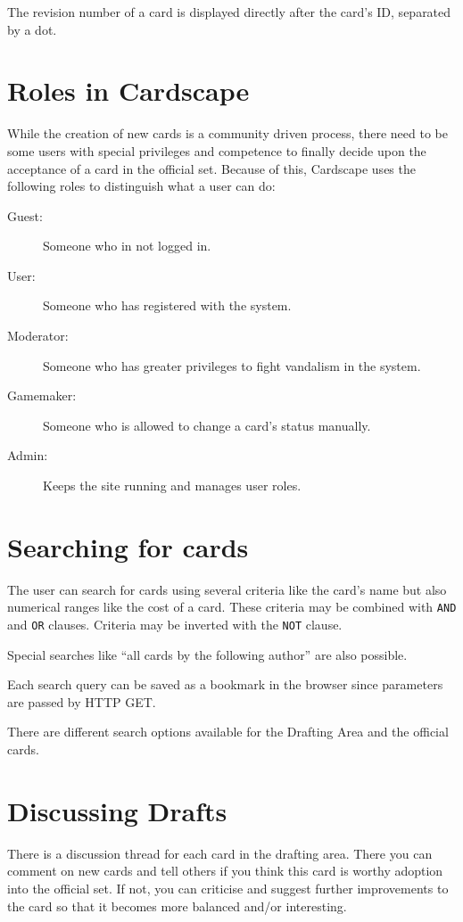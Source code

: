 \documentclass[a4paper, 11pt]{scrbook}
\begin{document}
The revision number of a card is displayed directly after the card's ID, separated by a dot.

\section{Roles in Cardscape}
While the creation of new cards is a community driven process, there need to be some users with special privileges and competence to finally decide upon the acceptance of a card in the official set. Because of this, Cardscape uses the following roles to distinguish what a user can do:

\begin{description}
 \item[Guest:] Someone who in not logged in.
 \item[User:] Someone who has registered with the system.
 \item[Moderator:] Someone who has greater privileges to fight vandalism in the system.
 \item[Gamemaker:] Someone who is allowed to change a card's status manually.
 \item[Admin:] Keeps the site running and manages user roles.
\end{description}

\section{Searching for cards}
The user can search for cards using several criteria like the card's name but also numerical ranges like the cost of a card. These criteria may be combined with \texttt{AND} and \texttt{OR} clauses. Criteria may be inverted with the \texttt{NOT} clause.

Special searches like ``all cards by the following author'' are also possible.

Each search query can be saved as a bookmark in the browser since parameters are passed by HTTP GET.

There are different search options available for the Drafting Area and the official cards.

\section{Discussing Drafts}
There is a discussion thread for each card in the drafting area. There you can comment on new cards and tell others if you think this card is worthy adoption into the official set. If not, you can criticise and suggest further improvements to the card so that it becomes more balanced and/or interesting.
\end{document}
